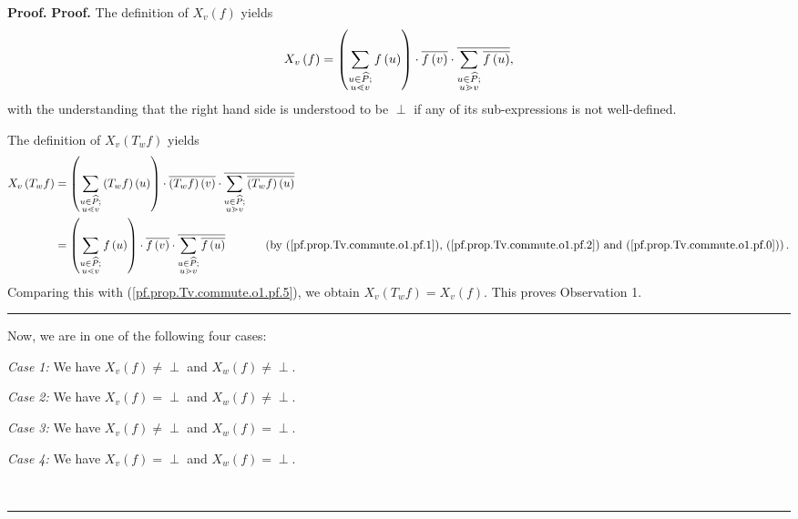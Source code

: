 \documentclass[numbers=enddot,12pt,final,onecolumn,notitlepage]{scrartcl}%
\theoremstyle{definition}
\newenvironment{verlong}{}{}
\newcommand{\undf}{\operatorname*{\bot}}
\newenvironment{proof}[1][Proof]{\noindent\textbf{#1.} }{\ \rule{0.5em}{0.5em}}
\let\sumnonlimits\sum
\renewcommand{\sum}{\sumnonlimits\limits}
\begin{document}
\begin{verlong}
\begin{proof}
\begin{proof}
The definition of $X_{v}\left(  f\right)  $ yields%
\begin{equation}
X_{v}\left(  f\right)  =\left(  \sum\limits_{\substack{u\in\widehat{P}%
;\\u\lessdot v}}f\left(  u\right)  \right)  \cdot\overline{f\left(  v\right)
}\cdot\overline{\sum\limits_{\substack{u\in\widehat{P};\\u\gtrdot v}%
}\overline{f\left(  u\right)  }}, \label{pf.prop.Tv.commute.o1.pf.5}%
\end{equation}
with the understanding that the right hand side is understood to be $\undf$ if
any of its sub-expressions is not well-defined.

The definition of $X_{v}\left(  T_{w}f\right)  $ yields%
\begin{align*}
X_{v}\left(  T_{w}f\right)   &  =\left(  \sum\limits_{\substack{u\in
\widehat{P};\\u\lessdot v}}\left(  T_{w}f\right)  \left(  u\right)  \right)
\cdot\overline{\left(  T_{w}f\right)  \left(  v\right)  }\cdot\overline
{\sum\limits_{\substack{u\in\widehat{P};\\u\gtrdot v}}\overline{\left(
T_{w}f\right)  \left(  u\right)  }}\\
&  =\left(  \sum\limits_{\substack{u\in\widehat{P};\\u\lessdot v}}f\left(
u\right)  \right)  \cdot\overline{f\left(  v\right)  }\cdot\overline
{\sum\limits_{\substack{u\in\widehat{P};\\u\gtrdot v}}\overline{f\left(
u\right)  }} \ \ \ \ \ \ \ \ \ \ \left(  \text{by
(\ref{pf.prop.Tv.commute.o1.pf.1}), (\ref{pf.prop.Tv.commute.o1.pf.2}) and
(\ref{pf.prop.Tv.commute.o1.pf.0})}\right)  .
\end{align*}
Comparing this with (\ref{pf.prop.Tv.commute.o1.pf.5}), we obtain
$X_{v}\left(  T_{w}f\right)  =X_{v}\left(  f\right)  $. This proves
Observation 1.
\end{proof}

Now, we are in one of the following four cases:

\textit{Case 1:} We have $X_{v}\left(  f\right)  \neq\undf$ and $X_{w}\left(
f\right)  \neq\undf$.

\textit{Case 2:} We have $X_{v}\left(  f\right)  =\undf$ and $X_{w}\left(
f\right)  \neq\undf$.

\textit{Case 3:} We have $X_{v}\left(  f\right)  \neq\undf$ and $X_{w}\left(
f\right)  =\undf$.

\textit{Case 4:} We have $X_{v}\left(  f\right)  =\undf$ and $X_{w}\left(
f\right)  =\undf$.


\end{proof}
\end{verlong}
\end{document}
